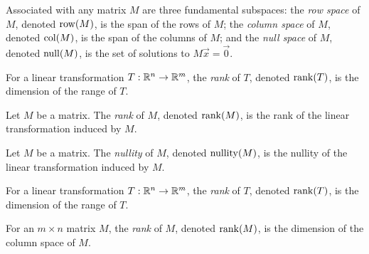 
\begin{SaveDefinition}[key=FundamentalSubspaces, title={Fundamental Subspaces}]
	Associated with any matrix $M$ are three fundamental subspaces: the
	\emph{row space} of $M$, denoted $\operatorname{row}(M)$, is the span of the rows of
	$M$; the
	\emph{column space} of $M$, denoted $\operatorname{col}(M)$, is the span of the
	columns of $M$; and the
	\emph{null space} of $M$, denoted $\operatorname{null}(M)$, is the set of solutions to
	$M\vec x=\vec 0$.
\end{SaveDefinition}

\begin{SaveDefinition}[key=RankofaLinearTransformation, title={Rank of a Linear Transformation}]
	For a linear transformation $T:\mathbb{R}^n\to \mathbb{R}^m$, the
	\emph{rank} of $T$, denoted $\operatorname{rank}(T)$, is the dimension of the range of
	$T$.
\end{SaveDefinition}

\begin{SaveDefinition}[key=RankofaMatrix, title={Rank of a Matrix}]
	Let $M$ be a matrix.
	The \emph{rank} of $M$, denoted $\operatorname{rank}(M)$, is the rank of
	the linear transformation induced by $M$.
\end{SaveDefinition}

\begin{SaveDefinition}[key=NullityofaMatrix, title={Nullity of a Matrix}]
	Let $M$ be a matrix.
	The \emph{nullity} of $M$, denoted $\operatorname{nullity}(M)$, is the nullity of
	the linear transformation induced by $M$.
\end{SaveDefinition}

\begin{SaveDefinition}[key=Rank, title={Rank}]
	For a linear transformation $T:\mathbb{R}^n\to \mathbb{R}^m$, the
	\emph{rank} of $T$, denoted $\operatorname{rank}(T)$, is the dimension of the range of
	$T$.

	For an $m\times n$ matrix $M$, the
	\emph{rank} of $M$, denoted $\operatorname{rank}(M)$, is the dimension of the 
	column space of $M$.
\end{SaveDefinition}

